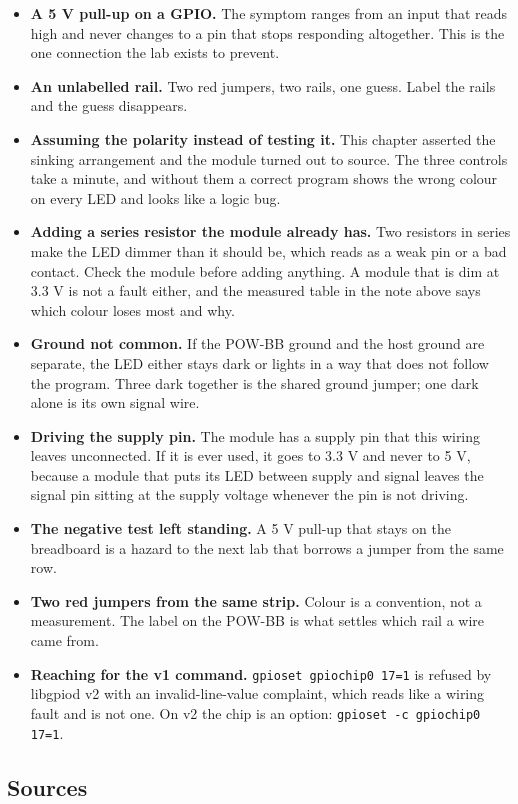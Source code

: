 \begin{itemize}
\item \textbf{A 5 V pull-up on a GPIO.} The symptom ranges from an input that reads high and never changes to a pin that stops responding altogether. This is the one connection the lab exists to prevent.
\item \textbf{An unlabelled rail.} Two red jumpers, two rails, one guess. Label the rails and the guess disappears.
\item \textbf{Assuming the polarity instead of testing it.} This chapter asserted the sinking arrangement and the module turned out to source. The three controls take a minute, and without them a correct program shows the wrong colour on every LED and looks like a logic bug.
\item \textbf{Adding a series resistor the module already has.} Two resistors in series make the LED dimmer than it should be, which reads as a weak pin or a bad contact. Check the module before adding anything. A module that is dim at 3.3 V is not a fault either, and the measured table in the note above says which colour loses most and why.
\item \textbf{Ground not common.} If the POW-BB ground and the host ground are separate, the LED either stays dark or lights in a way that does not follow the program. Three dark together is the shared ground jumper; one dark alone is its own signal wire.
\item \textbf{Driving the supply pin.} The module has a supply pin that this wiring leaves unconnected. If it is ever used, it goes to 3.3 V and never to 5 V, because a module that puts its LED between supply and signal leaves the signal pin sitting at the supply voltage whenever the pin is not driving.
\item \textbf{The negative test left standing.} A 5 V pull-up that stays on the breadboard is a hazard to the next lab that borrows a jumper from the same row.
\item \textbf{Two red jumpers from the same strip.} Colour is a convention, not a measurement. The label on the POW-BB is what settles which rail a wire came from.
\item \textbf{Reaching for the v1 command.} \texttt{gpioset gpiochip0 17=1} is refused by libgpiod v2 with an invalid-line-value complaint, which reads like a wiring fault and is not one. On v2 the chip is an option: \texttt{gpioset -c gpiochip0 17=1}.
\end{itemize}

\subsection*{Sources}

